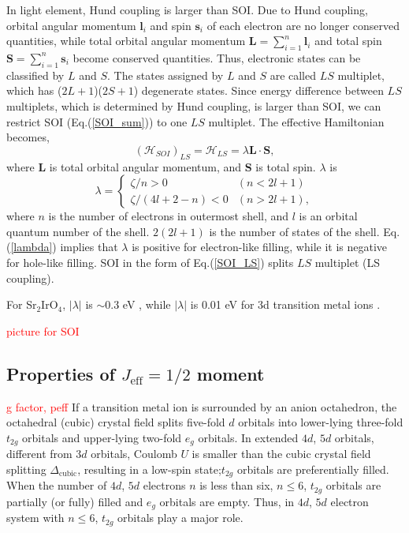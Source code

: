 In light element, Hund coupling is larger than SOI.
Due to Hund coupling, orbital angular momentum $\bm{l}_i$ and spin $\bm{s}_i$ of each electron are no longer conserved quantities, while
total orbital angular momentum $\bm{L} = \sum^n_{i=1}\bm{l}_i$ and total spin $\bm{S} = \sum^n_{i=1}\bm{s}_i$ become conserved quantities.
Thus, electronic states can be classified by $L$ and $S$.
The states assigned by $L$ and $S$ are called $LS$ multiplet, which has ($2L+1$)($2S+1$) degenerate states.
Since energy difference between $LS$ multiplets, which is determined by Hund coupling, is larger than SOI,
we can restrict SOI (Eq.(\ref{SOI_sum})) to one $LS$ multiplet.
The effective Hamiltonian becomes,
\begin{equation}
(\mathcal{H}_{SOI})_{LS} = \mathcal{H}_{LS} = \lambda\bm{L}\cdot\bm{S},
\label{SOI_LS}
\end{equation}
where $\bm{L}$ is total orbital angular momentum, and $\bm{S}$ is total spin.
$\lambda$ is
\begin{equation}
\lambda =
\begin{cases}
\zeta/n > 0 & (n < 2l+1)\\
\zeta/(4l+2-n) < 0 & (n > 2l+1),
\end{cases}
\label{lambda}
\end{equation}
where $n$ is the number of electrons in outermost shell, and $l$ is an orbital quantum number of the shell.
$2(2l+1)$ is the number of states of the shell.
Eq.(\ref{lambda}) implies that $\lambda$ is positive for electron-like filling, while it is negative for hole-like filling.
SOI in the form of Eq.(\ref{SOI_LS}) splits $LS$ multiplet (LS coupling).

For Sr$_2$IrO$_4$, $|\lambda|$ is $\sim 0.3$ eV \cite{kim2008novel}, while $|\lambda|$ is 0.01 eV for 3d transition metal ions \cite{Kanamori}.

\textcolor{red}{picture for SOI}

\subsection{Properties of $J_\mathrm{eff} = 1/2$ moment}
\textcolor{red}{g factor, peff}
If a transition metal ion is surrounded by an anion octahedron, the octahedral (cubic) crystal field splits five-fold $d$ orbitals into lower-lying three-fold $t_{2g}$ orbitals and upper-lying two-fold $e_g$ orbitals.
In extended $4d$, $5d$ orbitals, different from $3d$ orbitals,  Coulomb $U$ is smaller than the cubic crystal field splitting $\Delta_\mathrm{cubic}$, resulting in a low-spin state;$t_{2g}$ orbitals are preferentially filled.
When the number of $4d$, $5d$ electrons $n$ is less than six, $n \leq 6$, $t_{2g}$ orbitals are partially (or fully) filled and $e_g$ orbitals are empty.
Thus, in $4d$, $5d$ electron system with $n \leq 6$, $t_{2g}$ orbitals play a major role.

